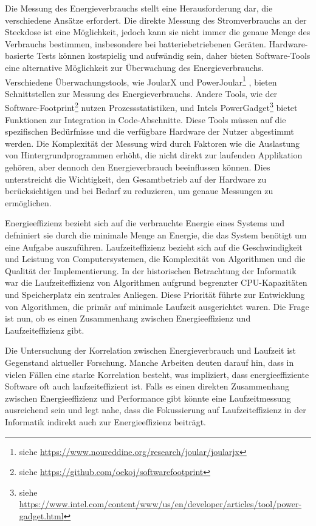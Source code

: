 \documentclass{article}
\begin{document}
Die Messung des Energieverbrauchs  stellt eine Herausforderung dar, die verschiedene Ansätze erfordert. Die direkte Messung des Stromverbrauchs an der Steckdose ist eine Möglichkeit, jedoch kann sie nicht immer die genaue Menge des Verbrauchs bestimmen, insbesondere bei batteriebetriebenen Geräten. Hardware-basierte Tests können kostspielig und aufwändig sein, daher bieten Software-Tools eine alternative Möglichkeit zur Überwachung des Energieverbrauchs.
Verschiedene Überwachungstools, wie JoularX und PowerJoular\footnote{%
   siehe  \href{https://www.noureddine.org/research/joular/joularjx}{https://www.noureddine.org/research/joular/joularjx}} \cite{noureddine-ie-2022}, bieten Schnittstellen zur Messung des Energieverbrauchs. Andere Tools, wie der Software-Footprint\footnote{%
   siehe  \href{https://github.com/oekoj/softwarefootprint}{https://github.com/oekoj/softwarefootprint}} nutzen Prozessstatistiken, und Intels PowerGadget\footnote{%
   siehe \href{https://www.intel.com/content/www/us/en/developer/articles/tool/power-gadget.html}{https://www.intel.com/content/www/us/en/developer/articles/tool/power-gadget.html}}  bietet Funktionen zur Integration in Code-Abschnitte. Diese Tools müssen auf die spezifischen Bedürfnisse und die verfügbare Hardware der Nutzer abgestimmt werden.
Die Komplexität der Messung wird durch Faktoren wie die Auslastung von Hintergrundprogrammen erhöht, die nicht direkt zur laufenden Applikation gehören, aber dennoch den Energieverbrauch beeinflussen können. Dies unterstreicht die Wichtigkeit, den Gesamtbetrieb auf der Hardware zu berücksichtigen und bei Bedarf zu reduzieren, um genaue Messungen zu ermöglichen. 


Energieeffizienz bezieht sich auf die verbrauchte Energie eines Systems \cite{brown_toward_2010} und defniniert
sie durch die minimale Menge an Energie, die das System benötigt um eine Aufgabe auszuführen.
Laufzeiteffizienz bezieht sich auf die Geschwindigkeit und Leistung von Computersystemen, die Komplexität von Algorithmen und die Qualität der Implementierung.
In der historischen Betrachtung der Informatik war die Laufzeiteffizienz von Algorithmen aufgrund begrenzter CPU-Kapazitäten und Speicherplatz ein zentrales Anliegen. Diese Priorität führte zur Entwicklung von Algorithmen, die primär auf minimale Laufzeit ausgerichtet waren. Die Frage ist nun, ob es einen Zusammenhang zwischen Energieeffizienz und Laufzeiteffizienz gibt. 



Die Untersuchung der Korrelation zwischen Energieverbrauch und Laufzeit ist Gegenstand aktueller Forschung.
Manche Arbeiten \cite{pereira_energy_2017,cascaval_folklore_2014,pinto_energy_2017} deuten darauf hin, dass in vielen Fällen eine starke Korrelation besteht, was impliziert, dass energieeffiziente Software oft auch laufzeiteffizient ist. Falls es einen direkten Zusammenhang zwischen Energieeffizienz und Performance gibt  könnte eine Laufzeitmessung ausreichend sein und legt nahe, dass die Fokussierung auf Laufzeiteffizienz in der Informatik indirekt auch zur Energieeffizienz beiträgt.
\end{document}
